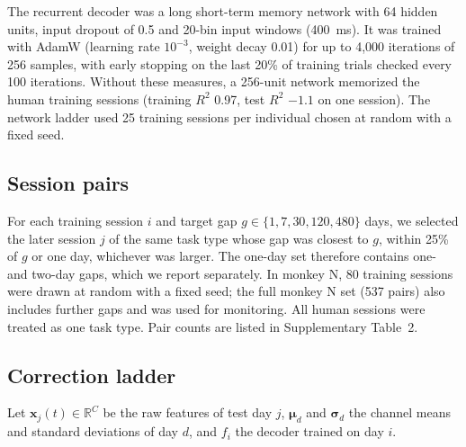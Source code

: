 \documentclass[pdflatex,sn-nature]{sn-jnl}
\begin{document}
The recurrent decoder was a long short-term memory network\cite{hochreiter1997} with 64 hidden units, input dropout\cite{srivastava2014} of
0.5 and 20-bin input windows (400~ms). It was trained with AdamW\cite{loshchilov2019} (learning rate $10^{-3}$, weight decay 0.01) for up to
4,000 iterations of 256 samples, with early stopping on the last 20\% of training trials checked every 100 iterations.
Without these measures, a 256-unit network memorized the human training sessions (training $R^2$ 0.97, test $R^2$
$-1.1$ on one session). The network ladder used 25 training sessions per individual chosen at random with a fixed seed.

\subsection*{Session pairs}

For each training session $i$ and target gap $g \in \{1, 7, 30, 120, 480\}$ days, we selected the later session $j$ of
the same task type whose gap was closest to $g$, within 25\% of $g$ or one day, whichever was larger. The one-day set
therefore contains one- and two-day gaps, which we report separately. In monkey N, 80 training sessions were drawn at
random with a fixed seed; the full monkey N set (537 pairs) also includes further gaps and was used for monitoring. All
human sessions were treated as one task type. Pair counts are listed in Supplementary Table~2.

\subsection*{Correction ladder}

Let $\mathbf{x}_j(t) \in \mathbb{R}^C$ be the raw features of test day $j$, $\boldsymbol{\mu}_d$ and
$\boldsymbol{\sigma}_d$ the channel means and standard deviations of day $d$, and $f_i$ the decoder trained on day $i$.
\end{document}

